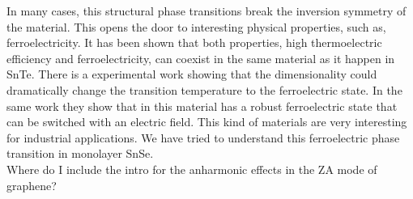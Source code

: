 In many cases, this structural phase transitions break the inversion symmetry of the material. This opens the door 
to interesting physical properties, such as, ferroelectricity. It has been shown that both properties, high 
thermoelectric efficiency and ferroelectricity, can coexist in the same material as it happen in SnTe. There is a 
experimental work showing that the dimensionality could dramatically change the transition temperature to the 
ferroelectric state. In the same work they show that in this material has a robust ferroelectric state that can be 
switched with an electric field. This kind of materials are very interesting for industrial applications. We have 
tried to understand this ferroelectric phase transition in monolayer SnSe. \\

Where do I include the intro for the anharmonic effects in the ZA mode of graphene?

